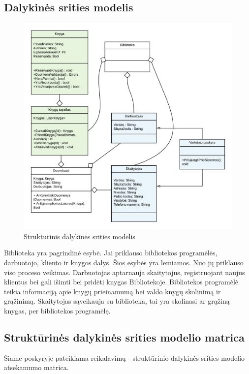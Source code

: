 \documentclass{VUMIFPSkursinis}
\begin{document}
\subsection{Dalykinės srities modelis}

\begin{figure}[H]
    \centering
    \includegraphics[width=1\textwidth]{diagramos/statinis_modelis.png}
    \caption{Struktūrinis dalykinės srities modelis} 
    
\end{figure}

Biblioteka yra pagrindinė esybė. Jai priklauso bibliotekos programėlės, darbuotojo, kliento ir knygos dalys. Šios esybės yra lemiamos. Nuo jų priklauso viso proceso veikimas. Darbuotojas aptarnauja skaitytojus, registruojant naujus klientus bei gali išimti bei pridėti knygas Bibliotekoje. Bibliotekos programėlė teikia informaciją apie knygų prieinamumą bei valdo knygų skolinimą ir grąžinimą. Skaitytojas sąveikauja su biblioteka, tai yra skolinasi ar grąžiną knygas, per bibliotekos programėlę.

\subsection{Struktūrinės dalykinės srities modelio matrica}

 Šiame poskyryje pateikiama reikalavimų - struktūrinio dalykinės srities modelio atsekamumo matrica. 
\end{document}
